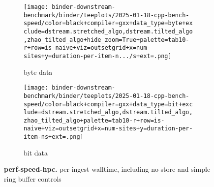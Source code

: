 \begin{figure*}

\begin{subfigure}{0.28\textwidth}
\centering
\texttt{[image: binder-downstream-benchmark/binder/teeplots/2025-01-18-cpp-bench-speed/color=black+compiler=gxx+data\_type=byte+exclude=dstream.stretched\_algo,dstream.tilted\_algo,zhao\_tilted\_algo+hide\_zoom=True+palette=tab10-r+row=is-naive+viz=outsetgrid+x=num-sites+y=duration-per-item-n.../s+ext=.png]}
\caption{byte data}
\label{fig:perf-speed-hpc:byte}
\end{subfigure}%
\begin{subfigure}{0.72\textwidth}
\texttt{[image: binder-downstream-benchmark/binder/teeplots/2025-01-18-cpp-bench-speed/color=black+compiler=gxx+data\_type=bit+exclude=dstream.stretched\_algo,dstream.tilted\_algo,zhao\_tilted\_algo+palette=tab10-r+row=is-naive+viz=outsetgrid+x=num-sites+y=duration-per-item-ns+ext=.png]}
\centering
\caption{bit data}
\label{fig:perf-speed-hpc:bit}
\end{subfigure}

\caption{
\textbf{perf-speed-hpc.}
\footnotesize
per-ingest walltime, including no-store and simple ring buffer controls
}
\label{fig:perf-speed-hpc}
\end{figure*}
